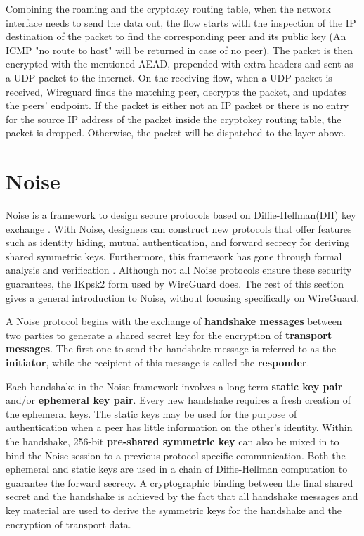  Combining the roaming and the cryptokey routing table, when the network interface needs
  to send the data out, the flow starts with the inspection of the IP destination of the packet 
  to find the corresponding peer and its public key (An ICMP "no route to host" will be returned
  in case of no peer). The packet is then encrypted with the mentioned AEAD, prepended with
  extra headers and sent as a UDP packet to the internet. On the receiving flow, when a UDP packet
  is received, Wireguard finds the matching peer, decrypts the packet, and updates the peers' endpoint.
  If the packet is either not an IP packet or there is no entry for the source IP address of the packet
  inside the cryptokey routing table, the packet is dropped. Otherwise, the packet will be dispatched
  to the layer above.
\section{Noise} \label{w2}
  Noise \cite{noise} is a framework to design secure protocols based on Diffie-Hellman(DH) key exchange \cite{dh}.
  With Noise, designers can construct new protocols that offer features such as identity hiding,
  mutual authentication, and forward secrecy for deriving shared symmetric keys. Furthermore, this
  framework has gone through formal analysis and verification \cite{noise_ex}. Although not all 
  Noise protocols ensure these security guarantees, the IKpsk2 form used by WireGuard does. 
  The rest of this section gives a general introduction to Noise, without focusing specifically on WireGuard.

  A Noise protocol begins with the exchange of \textbf{handshake messages} between two parties to
  generate a shared secret key for the encryption of \textbf{transport messages}. The first one
  to send the handshake message is referred to as the \textbf{initiator}, while the recipient of
  this message is called the \textbf{responder}.

  Each handshake in the Noise framework involves a long-term \textbf{static key pair} and/or
  \textbf{ephemeral key pair}. Every new handshake requires a fresh creation of the ephemeral
  keys. The static keys may be used for the purpose of authentication when a peer has little
  information on the other's identity. Within the handshake, 256-bit \textbf{pre-shared symmetric key}
  can also be mixed in to bind the Noise session to a previous protocol-specific communication.
  Both the ephemeral and static keys are used in a chain of Diffie-Hellman computation to guarantee
  the forward secrecy. A cryptographic binding between the final shared secret and the handshake
  is achieved by the fact that all handshake messages and key material are used to derive
  the symmetric keys for the handshake and the encryption of transport data.

